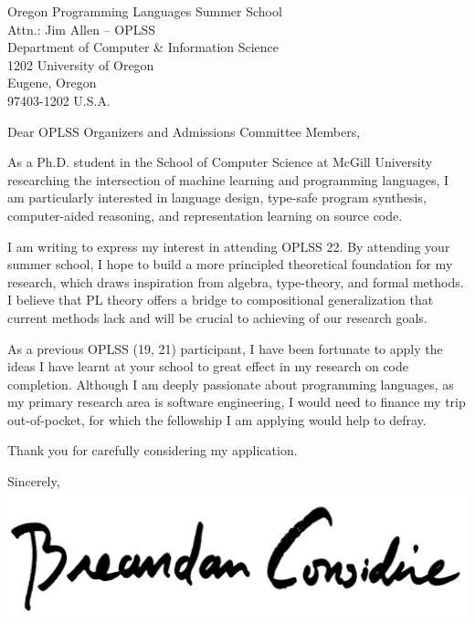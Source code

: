 \documentclass{letter}
\begin{document}
    \begin{letter}{Oregon Programming Languages Summer School\\Attn.: Jim Allen -- OPLSS\\Department of Computer \& Information Science\\1202 University of Oregon\\Eugene, Oregon\\97403-1202 U.S.A.}
        \opening{Dear OPLSS Organizers and Admissions Committee Members,}
        As a Ph.D. student in the School of Computer Science at McGill University researching the intersection of machine learning and programming languages, I am particularly interested in language design, type-safe program synthesis, computer-aided reasoning, and representation learning on source code.

        I am writing to express my interest in attending OPLSS \textsc{}22. By attending your summer school, I hope to build a more principled theoretical foundation for my research, which draws inspiration from algebra, type-theory, and formal methods. I believe that PL theory offers a bridge to compositional generalization that current methods lack and will be crucial to achieving of our research goals.

        As a previous OPLSS (\textsc{}19, \textsc{}21) participant, I have been fortunate to apply the ideas I have learnt at your school to great effect in my research on code completion. Although I am deeply passionate about programming languages, as my primary research area is software engineering, I would need to finance my trip out-of-pocket, for which the fellowship I am applying would help to defray.

        Thank you for carefully considering my application.

        \closing{Sincerely,\\
        \includegraphics[scale=0.06]{signature.png}\\
        }
    \end{letter}
\end{document}
